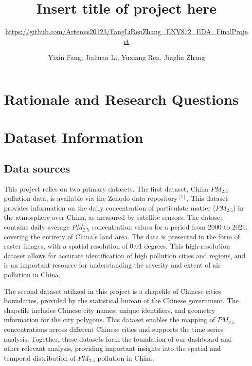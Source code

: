 \documentclass[
  12pt,
]{article}
\title{Insert title of project here}
\subtitle{\url{https://github.com/Artemis20123/FangLiRenZhang_ENV872_EDA_FinalProject}}
\author{Yixin Fang, Jiahuan Li, Yuxiang Ren, Jinglin Zhang}
\date{}
\begin{document}
\maketitle

\newpage
\tableofcontents 
\newpage
\listoftables 
\newpage
\listoffigures 
\newpage

\hypertarget{rationale-and-research-questions}{%
\section{Rationale and Research
Questions}\label{rationale-and-research-questions}}

\newpage

\hypertarget{dataset-information}{%
\section{Dataset Information}\label{dataset-information}}

\hypertarget{data-sources}{%
\subsection{Data sources}\label{data-sources}}

This project relies on two primary datasets. The first dataset, China
\(PM_{2.5}\) pollution data, is available via the Zenodo data
repository\(^{[1]}\). This dataset provides information on the daily
concentration of particulate matter (\(PM_{2.5}\)) in the atmosphere
over China, as measured by satellite sensors. The dataset contains daily
average \(PM_{2.5}\) concentration values for a period from 2000 to
2021, covering the entirety of China's land area. The data is presented
in the form of raster images, with a spatial resolution of 0.01 degrees.
This high-resolution dataset allows for accurate identification of high
pollution cities and regions, and is an important resource for
understanding the severity and extent of air pollution in China.

The second dataset utilized in this project is a shapefile of Chinese
cities boundaries, provided by the statistical bureau of the Chinese
government. The shapefile includes Chinese city names, unique
identifiers, and geometry information for the city polygons. This
dataset enables the mapping of \(PM_{2.5}\) concentrations across
different Chinese cities and supports the time series analysis.
Together, these datasets form the foundation of our dashboard and other
relevant analysis, providing important insights into the spatial and
temporal distribution of \(PM_{2.5}\) pollution in China.
\end{document}
